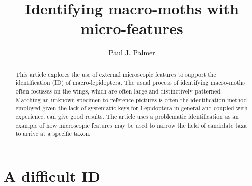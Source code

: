 \documentclass[]{article}
\title{Identifying macro-moths with micro-features}
\author{Paul J. Palmer}
\begin{document}
\maketitle

\begin{abstract}

This article explores the use of external microscopic features to support the identification (ID) of  macro-lepidoptera. The usual process of identifying macro-moths often focusses on the wings, which are often large and distinctively patterned. Matching an unknown specimen to reference pictures is often the identification method employed given the lack of systematic keys for Lepidoptera in general and coupled with experience, can give good results. The article uses a problematic identification as an example of how microscopic features may be used to narrow the field of candidate taxa to arrive at a specific taxon. 

\end{abstract}

\section*{A difficult ID}
\end{document}
